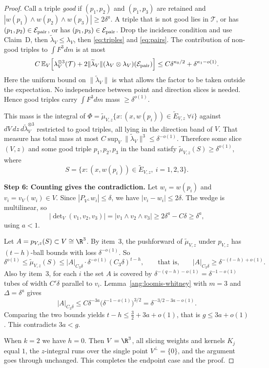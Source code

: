 \begin{proof}
Call a triple \emph{good} if $(p_1,p_2)$ and $(p_1,p_3)$ are retained and $|w(p_1)\wedge w(p_2)\wedge w(p_3)|\ge2\delta^a$. A triple that is not good lies in $\mathcal T$, or has $(p_1,p_2)\in\mathcal E_{\rm pair}$, or has $(p_1,p_3)\in\mathcal E_{\rm pair}$. Drop the incidence condition and use Claim~D, then $\widetilde\lambda_V\le\lambda_V$, then \eqref{eq:triples} and \eqref{eq:pairs}. The contribution of non-good triples to $\int F^3dm$ is at most
\[
 C\,\mathbb E_V\Bigl[\lambda_V^{\otimes3}(\mathcal T)+2\|\widetilde\lambda_V\|(\lambda_V\otimes\lambda_V)(\mathcal E_{\rm pair})\Bigr]
 \le C\delta^{\kappa_0/2}+\delta^{\kappa_1-o(1)}.
\]
Here the uniform bound on $\|\widetilde\lambda_V\|$ is what allows the factor to be taken outside the expectation. No independence between point and direction slices is needed. Hence good triples carry $\int F^3dm$ mass $\ge\delta^{o(1)}$.

This mass is the integral of $\Phi=\widetilde\mu_{V,z}\{x:(x,w(p_i))\in\widetilde E_{V,z}\ \forall i\}$ against $dV\,dz\,d\widetilde\lambda_V^{\otimes3}$ restricted to good triples, all lying in the direction band of $V$. That measure has total mass at most $C\sup_V\|\widetilde\lambda_V\|^3\le\delta^{-o(1)}$. Therefore some slice $(V,z)$ and some good triple $p_1,p_2,p_3$ in the band satisfy $\widetilde\mu_{V,z}(S)\ge\delta^{o(1)}$, where
\[
 S=\{x:(x,w(p_i))\in\widetilde E_{V,z},\ i=1,2,3\}.
\]

\textbf{Step 6: Counting gives the contradiction.} Let $w_i=w(p_i)$ and $v_i=v_V(w_i)\in V$. Since $|P_{V^\perp}w_i|\le\delta$, we have $|v_i-w_i|\le2\delta$. The wedge is multilinear, so
\[
 |\det\nolimits_V(v_1,v_2,v_3)|=|v_1\wedge v_2\wedge v_3|\ge2\delta^a-C\delta\ge\delta^a,
\]
using $a<1$.

Let $A=p_{V,z}(S)\subset V\cong\R^3$. By item~3, the pushforward of $\widetilde\mu_{V,z}$ under $p_{V,z}$ has $(t-h)$-ball bounds with loss $\delta^{-o(1)}$. So
\[
 \delta^{o(1)}\le\widetilde\mu_{V,z}(S)\le|A|_{C_3\delta}\cdot\delta^{-o(1)}(C_3\delta)^{t-h},
 \qquad\text{that is,}\qquad |A|_{C_3\delta}\ge\delta^{-(t-h)+o(1)}.
\]
Also by item~3, for each $i$ the set $A$ is covered by $\delta^{-(q-h)-o(1)}=\delta^{-1-o(1)}$ tubes of width $C'\delta$ parallel to $v_i$. Lemma~\ref{ang:loomis-whitney} with $m=3$ and $\Delta=\delta^a$ gives
\[
 |A|_{C_3\delta}\le C\delta^{-3a}\bigl(\delta^{-1-o(1)}\bigr)^{3/2}=\delta^{-3/2-3a-o(1)}.
\]
Comparing the two bounds yields $t-h\le\tfrac32+3a+o(1)$, that is $g\le3a+o(1)$. This contradicts $3a<g$.

When $k=2$ we have $h=0$. Then $V=\R^3$, all slicing weights and kernels $K_j$ equal $1$, the $z$-integral runs over the single point $V^\perp=\{0\}$, and the argument goes through unchanged. This completes the endpoint case and the proof.
\end{proof}
